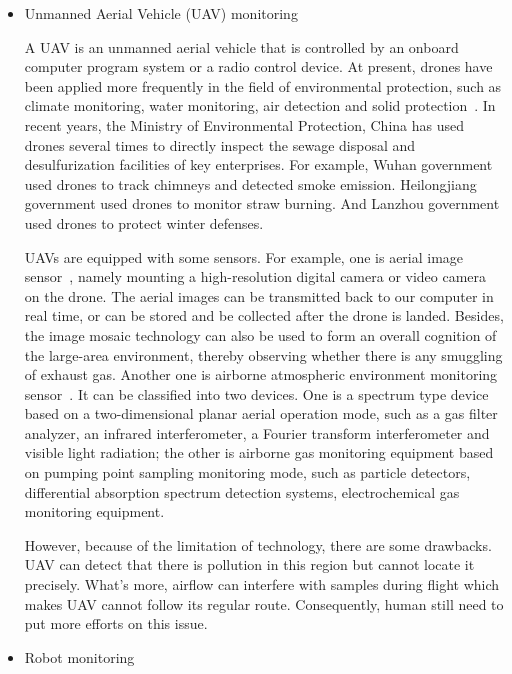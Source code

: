 \documentclass[letterpaper, twocolumn, 10pt, conference]{IEEEtran}
\begin{document}
\begin{itemize}

\item Unmanned Aerial Vehicle (UAV) monitoring

A UAV is an unmanned aerial vehicle that is controlled by an onboard computer program system or a radio control device. At present, drones have been applied more frequently in the field of environmental protection, such as climate monitoring, water monitoring, air detection and solid protection~\cite{conte2008integrated}. In recent years, the Ministry of Environmental Protection, China has used drones several times to directly inspect the sewage disposal and desulfurization facilities of key enterprises. For example, Wuhan government used drones to track chimneys and detected smoke emission. Heilongjiang government used drones to monitor straw burning. And Lanzhou government used drones to protect winter defenses. 

UAVs are equipped with some sensors. For example, one is aerial image sensor~\cite{quaritsch2010networked}, namely mounting a high-resolution digital camera or video camera on the drone. The aerial images can be transmitted back to our computer in real time, or can be stored and be collected after the drone is landed. Besides, the image mosaic technology can also be used to form an overall cognition of the large-area environment, thereby observing whether there is any smuggling of exhaust gas. Another one is airborne atmospheric environment monitoring sensor~\cite{colomina2014unmanned, klemas2015coastal, turner2012automated}. It can be classified into two devices. One is a spectrum type device based on a two-dimensional planar aerial operation mode, such as a gas filter analyzer, an infrared interferometer, a Fourier transform interferometer and visible light radiation; the other is airborne gas monitoring equipment based on pumping point sampling monitoring mode, such as particle detectors, differential absorption spectrum detection systems, electrochemical gas monitoring equipment.

However, because of the limitation of technology, there are some drawbacks. UAV can detect that there is pollution in this region but cannot locate it precisely. What's more, airflow can interfere with samples during flight which makes UAV cannot follow its regular route. Consequently, human still need to put more efforts on this issue.

\item  Robot monitoring


\end{itemize}
\end{document}
